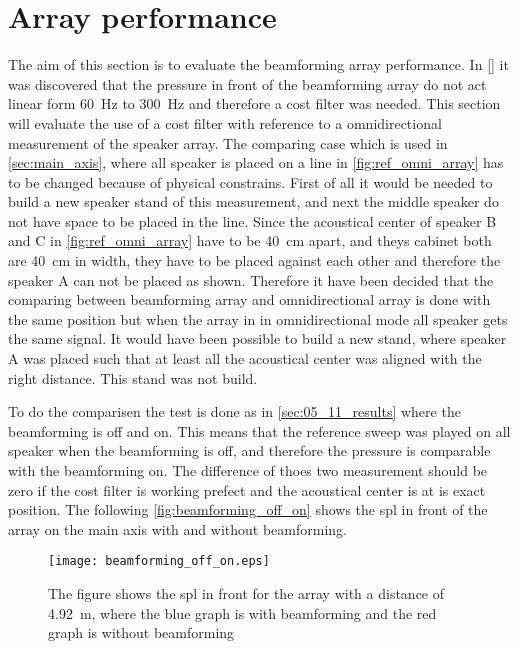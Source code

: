 \section{Array performance} \label{sec:beamforming_array_spl}

The aim of this section is to evaluate the beamforming array performance. In \autoref{} it was discovered that the pressure in front of the beamforming array do not act linear form \SI{60}{\hertz} to \SI{300}{\hertz} and therefore a cost filter was needed. This section will evaluate the use of a cost filter with reference to a omnidirectional measurement of the speaker array. The comparing case which is used in \autoref{sec:main_axis}, where all speaker is placed on a line in \autoref{fig:ref_omni_array} has to be changed because of physical constrains. First of all it would be needed to build a new speaker stand of this measurement, and next the middle speaker do not have space to be placed in the line. Since the acoustical center of speaker B and C in \autoref{fig:ref_omni_array} have to be \SI{40}{\centi\meter} apart, and theys cabinet both are \SI{40}{\centi\meter} in width, they have to be placed against each other and therefore the speaker A can not be placed as shown. Therefore it have been decided that the comparing between beamforming array and omnidirectional array is done with the same position but when the array in in omnidirectional mode all speaker gets the same signal. It would have been possible to build a new stand, where speaker A was placed such that at  least all the acoustical center was aligned with the right distance. This stand was not build.

To do the comparisen the test is done as in \autoref{sec:05_11_results} where the beamforming is off and on. This means that the reference sweep was played on all speaker when the beamforming is off, and therefore the pressure is comparable with the beamforming on. The difference of thoes two measurement should be zero if the cost filter is working prefect and the acoustical center is at is exact position. The following \autoref{fig:beamforming_off_on} shows the \gls{spl} in front of the array on the main axis with and without beamforming.

  \begin{figure}[H]
	\centering
	\texttt{[image: beamforming\_off\_on.eps]}
	\caption{The figure shows the \gls{spl} in front for the array with a distance of \SI{4.92}{\meter}, where the blue graph is with beamforming and the red graph is without beamforming}
		\label{fig:beamforming_off_on}
\end{figure}


